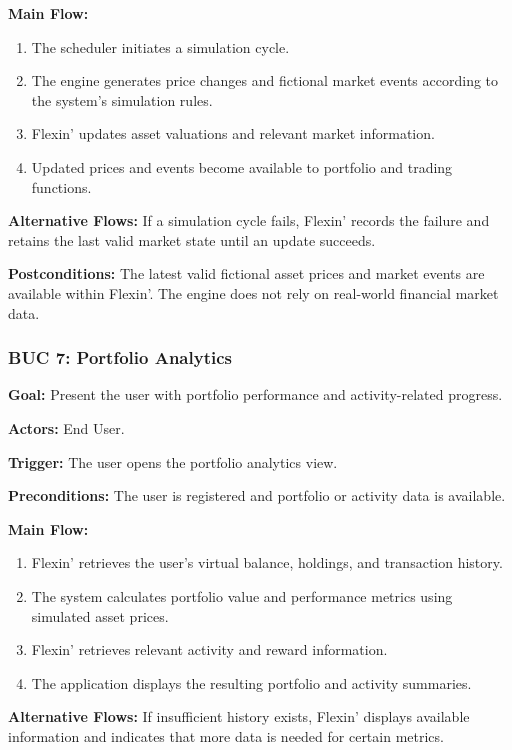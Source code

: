 \documentclass[12pt]{article}
\begin{document}
\textbf{Main Flow:}
\begin{enumerate}
    \item The scheduler initiates a simulation cycle.
    \item The engine generates price changes and fictional market events
    according to the system's simulation rules.
    \item Flexin' updates asset valuations and relevant market information.
    \item Updated prices and events become available to portfolio and trading
    functions.
\end{enumerate}

\textbf{Alternative Flows:} If a simulation cycle fails, Flexin' records the
failure and retains the last valid market state until an update succeeds.

\textbf{Postconditions:} The latest valid fictional asset prices and market
events are available within Flexin'. The engine does not rely on real-world
financial market data.

\subsubsection*{BUC 7: Portfolio Analytics}

\textbf{Goal:} Present the user with portfolio performance and activity-related
progress.

\textbf{Actors:} End User.

\textbf{Trigger:} The user opens the portfolio analytics view.

\textbf{Preconditions:} The user is registered and portfolio or activity data
is available.

\textbf{Main Flow:}
\begin{enumerate}
    \item Flexin' retrieves the user's virtual balance, holdings, and transaction
    history.
    \item The system calculates portfolio value and performance metrics using
    simulated asset prices.
    \item Flexin' retrieves relevant activity and reward information.
    \item The application displays the resulting portfolio and activity summaries.
\end{enumerate}

\textbf{Alternative Flows:} If insufficient history exists, Flexin' displays
available information and indicates that more data is needed for certain
metrics.
\end{document}
